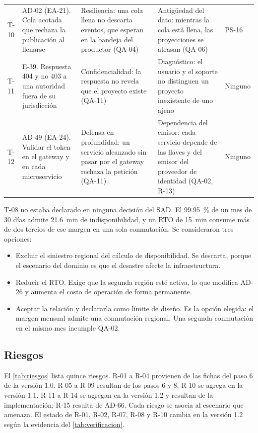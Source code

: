 \documentclass[11pt,letterpaper]{article}
\begin{document}
\begin{longtable}{L{1.05cm} L{3.2cm} L{4.3cm} L{4.5cm} L{1.6cm}}
T-10 & AD-02 (EA-21). Cola acotada que rechaza la publicación al llenarse & Resiliencia: una cola
llena no descarta eventos, que esperan en la bandeja del productor (QA-04) & Antigüedad del dato:
mientras la cola está llena, las proyecciones se atrasan (QA-06) & PS-16 \\
T-11 & E-39. Respuesta 404 y no 403 a una autoridad fuera de su jurisdicción & Confidencialidad: la
respuesta no revela que el proyecto existe (QA-11) & Diagnóstico: el usuario y el soporte no
distinguen un proyecto inexistente de uno ajeno & Ninguno \\
T-12 & AD-49 (EA-24). Validar el token en el gateway y en cada microservicio & Defensa en
profundidad: un servicio alcanzado sin pasar por el gateway rechaza la petición (QA-11) &
Dependencia del emisor: cada servicio depende de las llaves y del emisor del proveedor de identidad
(QA-02, R-13) & Ninguno \\
\end{longtable}

T-08 no estaba declarado en ninguna decisión del SAD. El \qty{99.95}{\percent} de un mes de 30 días
admite \qty{21.6}{\minute} de indisponibilidad, y un RTO de \qty{15}{\minute} consume más de dos
tercios de ese margen en una sola conmutación. Se consideraron tres opciones:

\begin{itemize}
  \item Excluir el siniestro regional del cálculo de disponibilidad. Se descarta, porque el
        escenario del dominio es que el desastre afecte la infraestructura.
  \item Reducir el RTO. Exige que la segunda región esté activa, lo que modifica AD-26 y aumenta el
        costo de operación de forma permanente.
  \item Aceptar la relación y declararla como límite de diseño. Es la opción elegida: el margen
        mensual admite una conmutación regional. Una segunda conmutación en el mismo mes incumple
        QA-02.
\end{itemize}

\subsection{Riesgos}
\label{sec:riesgos}

El \cref{tab:riesgos} lista quince riesgos. R-01 a R-04 provienen de las fichas del paso 6 de la
versión 1.0. R-05 a R-09 resultan de los pasos 6 y 8. R-10 se agrega en la versión 1.1. R-11 a R-14
se agregan en la versión 1.2 y resultan de la implementación; R-15 resulta de AD-66. Cada riesgo se asocia al escenario que
amenaza. El estado de R-01, R-02, R-07, R-08 y R-10 cambia en la versión 1.2 según la evidencia del
\cref{tab:verificacion}.
\end{document}
